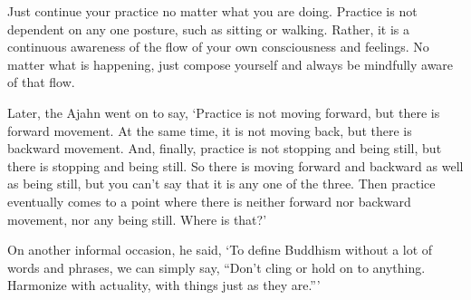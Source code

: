 Just continue your practice no matter what you are doing. Practice is not dependent on any one posture, such as sitting or walking. Rather, it is a continuous awareness of the flow of your own consciousness and feelings. No matter what is happening, just compose yourself and always be mindfully aware of that flow.

Later, the Ajahn went on to say, `Practice is not moving forward, but there is forward movement. At the same time, it is not moving back, but there is backward movement. And, finally, practice is not stopping and being still, but there is stopping and being still. So there is moving forward and backward as well as being still, but you can't say that it is any one of the three. Then practice eventually comes to a point where there is neither forward nor backward movement, nor any being still. Where is that?'

On another informal occasion, he said, `To define Buddhism without a lot of words and phrases, we can simply say, ``Don't cling or hold on to anything. Harmonize with actuality, with things just as they are.''\thinspace'
